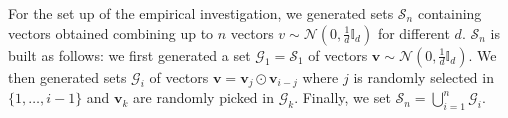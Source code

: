 \documentclass[twoside,11pt]{article}
\def\vec#1{\mathbf{#1}}
\def\smallvectors#1{\mathcal{#1}}
\def\degree#1{d(#1)}
\def\mo{\odot}
\newcounter{properties}
\def\LD#1{[{\color{blue}L}D] {\color{blue}#1}}
\begin{document}
For the set up of the empirical investigation, we generated sets $\smallvectors{S}_n$ containing vectors obtained combining up to $n$ vectors $v \sim \mathcal{N}(0,\frac{1}{d}\mathbb{I}_d)$ for different $d$.  
$\smallvectors{S}_n$ is built as follows: we first generated a set $\smallvectors{G}_1=\smallvectors{S}_1$ of vectors $\vec v\sim \mathcal{N}(0,\frac{1}{d}\mathbb{I}_d)$.
We then generated sets $\smallvectors{G}_i $ of  vectors $\vec{v}=\vec{v}_{j}\mo \vec{v}_{i-j}$ where $j$ is randomly selected in $\{1,\ldots,i-1\}$ and $\vec{v}_{k}$ are randomly picked in $\smallvectors{G}_k$. Finally, we set $\smallvectors{S}_n = \bigcup_{i=1}^n \smallvectors{G}_i$. 

%
%
\end{document}
